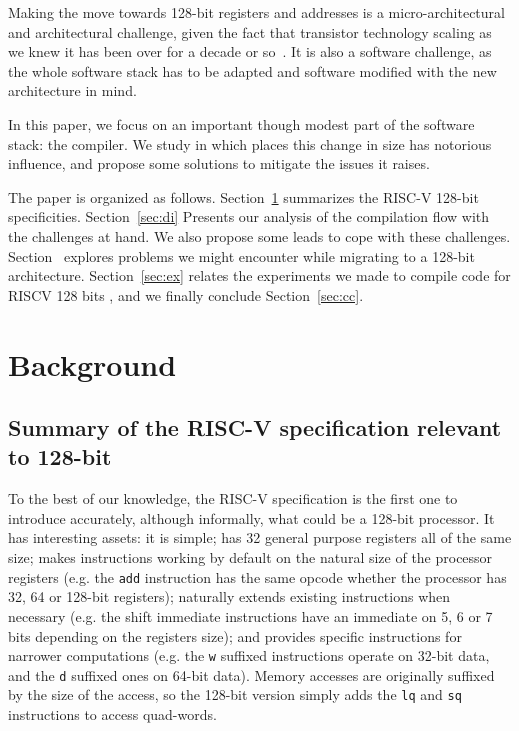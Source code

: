 \documentclass[a4paper,conference]{IEEEtran}
\newcommand{\riscv}{\textsc{\small RISC-V}\xspace}
\begin{document}
Making the move towards 128-bit registers and addresses is a micro-architectural and architectural challenge, given the fact that transistor technology scaling as we knew it has been over for a decade or so~\cite{mack2011fifty}.
It is also a software challenge, as the whole software stack has to be adapted and software modified with the new architecture in mind.

In this paper, we focus on an important though modest part of the software stack: the compiler.
We study in which places this change in size has notorious influence, and propose some solutions to mitigate the issues it raises.

The paper is organized as follows.
Section~\ref{sec:bg} summarizes the \riscv 128-bit specificities.
Section~\ref{sec:di} Presents our analysis of the compilation flow with the challenges at hand.
We also propose some leads to cope with these challenges.
Section~\label{sec:fp} explores problems we might encounter while migrating to a 128-bit architecture. 
Section~\ref{sec:ex} relates the experiments we made to compile code for RISCV 128 bits , and we finally conclude Section~\ref{sec:cc}.


\section{Background}
\label{sec:bg}
\subsection{Summary of the \riscv specification relevant to 128-bit}
To the best of our knowledge, the \riscv specification is the first one to introduce accurately, although informally, what could be a 128-bit processor.
It has interesting assets: it is simple; has 32 general purpose registers all of the same size; makes instructions working by default on the natural size of the processor registers (e.g. the \texttt{add} instruction has the same opcode whether the processor has 32, 64 or 128-bit registers); naturally extends existing instructions when necessary (e.g. the shift immediate instructions have an immediate on 5, 6 or 7 bits depending on the registers size); and provides specific instructions for narrower computations (e.g. the \texttt{w} suffixed instructions operate on 32-bit data, and the \texttt{d} suffixed ones on 64-bit data).
Memory accesses are originally suffixed by the size of the access, so the 128-bit version simply adds the \texttt{lq} and \texttt{sq} instructions to access quad-words.
\end{document}
